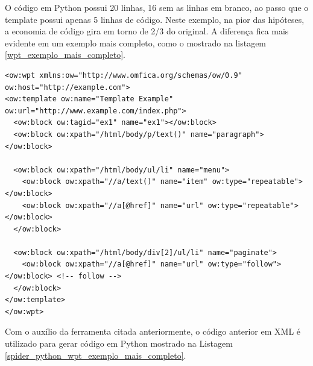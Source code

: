 O código em Python possui 20 linhas, 16 sem as linhas em branco, ao passo que o template possui apenas 5 linhas de código. Neste exemplo, na pior das hipóteses, a economia de código gira em torno de 2/3 do original. A diferença fica mais evidente em um exemplo mais completo, como o mostrado na listagem \ref{wpt_exemplo_mais_completo}.

\begin{lstlisting}[label=wpt_exemplo_mais_completo]
<ow:wpt xmlns:ow="http://www.omfica.org/schemas/ow/0.9"
ow:host="http://example.com">
<ow:template ow:name="Template Example" ow:url="http://www.example.com/index.php">
  <ow:block ow:tagid="ex1" name="ex1"></ow:block>
  <ow:block ow:xpath="/html/body/p/text()" name="paragraph"></ow:block>
  
  <ow:block ow:xpath="/html/body/ul/li" name="menu">
    <ow:block ow:xpath="//a/text()" name="item" ow:type="repeatable"></ow:block>
    <ow:block ow:xpath="//a[@href]" name="url" ow:type="repeatable"></ow:block>
  </ow:block>
  
  <ow:block ow:xpath="/html/body/div[2]/ul/li" name="paginate">
    <ow:block ow:xpath="//a[@href]" name="url" ow:type="follow"></ow:block> <!-- follow -->
  </ow:block>
</ow:template> 
</ow:wpt>
\end{lstlisting}

Com o auxílio da ferramenta citada anteriormente, o código anterior em XML é utilizado para gerar código em Python mostrado na Listagem \ref{spider_python_wpt_exemplo_mais_completo}.


